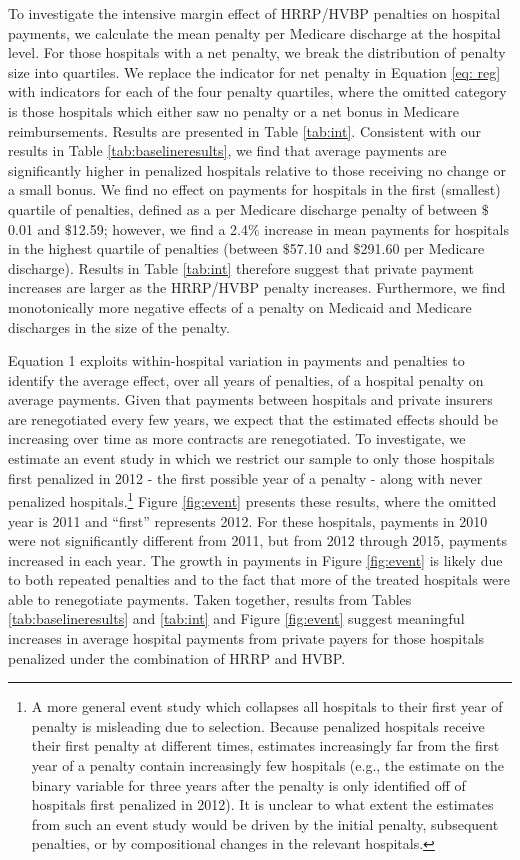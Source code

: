 \documentclass[12pt]{article}
\begin{document}
To investigate the intensive margin effect of HRRP/HVBP penalties on hospital payments, we calculate the mean penalty per Medicare discharge at the hospital level.  For those hospitals with a net penalty, we break the distribution of penalty size into quartiles.  We replace the indicator for net penalty in Equation \ref{eq: reg} with indicators for each of the four penalty quartiles, where the omitted category is those hospitals which either saw no penalty or a net bonus in Medicare reimbursements. Results are presented in Table \ref{tab:int}.  Consistent with our results in Table \ref{tab:baselineresults}, we find that average payments are significantly higher in penalized hospitals relative to those receiving no change or a small bonus.  We find no effect on payments for hospitals in the first (smallest) quartile of penalties, defined as a per Medicare discharge penalty of between $\$$0.01 and $\$$12.59; however, we find a 2.4$\%$ increase in mean payments for hospitals in the highest quartile of penalties (between $\$$57.10 and $\$$291.60 per Medicare discharge).  Results in Table \ref{tab:int} therefore suggest that private payment increases are larger as the HRRP/HVBP penalty increases. Furthermore, we find monotonically more negative effects of a penalty on Medicaid and Medicare discharges in the size of the penalty.

Equation 1 exploits within-hospital variation in payments and penalties to identify the average effect, over all years of penalties, of a hospital penalty on average payments.  Given that payments between hospitals and private insurers are renegotiated every few years, we expect that the estimated effects should be increasing over time as more contracts are renegotiated. To investigate, we estimate an event study in which we restrict our sample to only those hospitals first penalized in 2012 - the first possible year of a penalty - along with never penalized hospitals.\footnote{A more general event study which collapses all hospitals to their first year of penalty is misleading due to selection.  Because penalized hospitals receive their first penalty at different times, estimates increasingly far from the first year of a penalty contain increasingly few hospitals (e.g., the estimate on the binary variable for three years after the penalty is only identified off of hospitals first penalized in 2012). It is unclear to what extent the estimates from such an event study would be driven by the initial penalty, subsequent penalties, or by compositional changes in the relevant hospitals.}  Figure \ref{fig:event} presents these results, where the omitted year is 2011 and ``first'' represents 2012.  For these hospitals, payments in 2010 were not significantly different from 2011, but from 2012 through 2015, payments increased in each year.  The growth in payments in Figure \ref{fig:event} is likely due to both repeated penalties and to the fact that more of the treated hospitals were able to renegotiate payments.  Taken together, results from Tables \ref{tab:baselineresults} and \ref{tab:int} and Figure \ref{fig:event} suggest meaningful increases in average hospital payments from private payers for those hospitals penalized under the combination of HRRP and HVBP.
\end{document}
